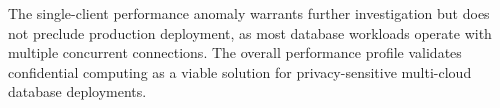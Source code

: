 The single-client performance anomaly warrants further investigation but does not preclude production deployment, as most database workloads operate with multiple concurrent connections. The overall performance profile validates confidential computing as a viable solution for privacy-sensitive multi-cloud database deployments.
